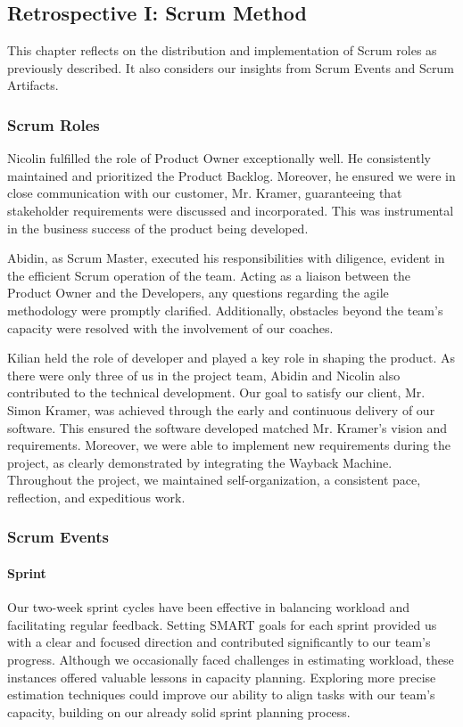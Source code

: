 \subsection{Retrospective I: Scrum Method}

This chapter reflects on the distribution and implementation of Scrum roles as previously described.
It also considers our insights from Scrum Events and Scrum Artifacts.

\subsubsection{Scrum Roles}

Nicolin fulfilled the role of Product Owner exceptionally well.
He consistently maintained and prioritized the Product Backlog.
Moreover, he ensured we were in close communication with our customer, Mr. Kramer, guaranteeing that stakeholder requirements were discussed and incorporated.
This was instrumental in the business success of the product being developed.

Abidin, as Scrum Master, executed his responsibilities with diligence, evident in the efficient Scrum operation of the team.
Acting as a liaison between the Product Owner and the Developers, any questions regarding the agile methodology were promptly clarified.
Additionally, obstacles beyond the team's capacity were resolved with the involvement of our coaches.

Kilian held the role of developer and played a key role in shaping the product.
As there were only three of us in the project team, Abidin and Nicolin also contributed to the technical development.
Our goal to satisfy our client, Mr. Simon Kramer, was achieved through the early and continuous delivery of our software.
This ensured the software developed matched Mr. Kramer's vision and requirements.
Moreover, we were able to implement new requirements during the project, as clearly demonstrated by integrating the Wayback Machine.
Throughout the project, we maintained self-organization, a consistent pace, reflection, and expeditious work.

\subsubsection{Scrum Events}

\paragraph{Sprint}
Our two-week sprint cycles have been effective in balancing workload and facilitating regular feedback.
Setting SMART goals for each sprint provided us with a clear and focused direction and contributed significantly to our team's progress.
Although we occasionally faced challenges in estimating workload, these instances offered valuable lessons in capacity planning.
Exploring more precise estimation techniques could improve our ability to align tasks with our team's capacity, building on our already solid sprint planning process.

